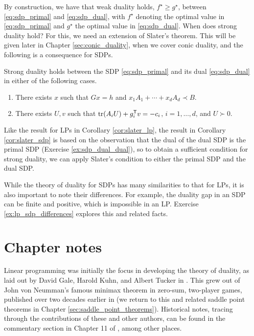 By construction, we have that weak duality holds, $f^\star \geq g^\star$,
between \eqref{eq:sdp_primal} and \eqref{eq:sdp_dual}, with $f^\star$ denoting 
the optimal value in \eqref{eq:sdp_primal} and $g^\star$ the optimal value in 
\eqref{eq:sdp_dual}. When does strong duality hold? For this, we need an
extension of Slater's theorem. This will be given later in Chapter
\ref{sec:conic_duality}, when we cover conic duality, and the following is a    
consequence for SDPs. 

\begin{Corollary}
\label{cor:slater_sdp}
Strong duality holds between the SDP \eqref{eq:sdp_primal} and its dual
\eqref{eq:sdp_dual} in either of the following cases. 

\begin{enumerate}[label=(\roman*)]
\item There exists $x$ such that $Gx = h$ and $x_1 A_1 + \cdots + x_d A_d 
  \prec B$.  
\item There exists $U,v$ such that $\operatorname{tr}(A_iU) + g_i^{\mathsf{T}} v = -c_i$, $i =
  1,\dots,d$, and $U \succ 0$. 
\end{enumerate}
\end{Corollary}

Like the result for LPs in Corollary \ref{cor:slater_lp}, the result in
Corollary \ref{cor:slater_sdp} is based on the observation that the dual of the 
dual SDP is the primal SDP (Exercise \ref{ex:sdp_dual_dual}), so to obtain
a sufficient condition for strong duality, we can apply Slater's condition to
either the primal SDP and the dual SDP. 

While the theory of duality for SDPs has many similarities to that for LPs, it is
also important to note their differences. For example, the duality gap in an SDP
can be finite and positive, which is impossible in an LP. Exercise
\ref{ex:lp_sdp_differences} explores this and related facts.     

\SkipTocEntry\section*{Chapter notes}

Linear programming was initially the focus in developing the theory of 
duality, as laid out by David Gale, Harold Kuhn, and Albert Tucker in
\cite{gale1951linear}. This grew out of John von Neumman's famous minimax 
theorem in zero-sum, two-player games, published over two decades
earlier in \cite{vonneumann1928theorie} (we return to this and related
saddle point theorems in Chapter \ref{sec:saddle_point_theorems}). Historical
notes, tracing through the contributions of these and other authors, can be
found in the commentary section in Chapter 11 of
\cite{rockafellar2009variational}, among other places.

